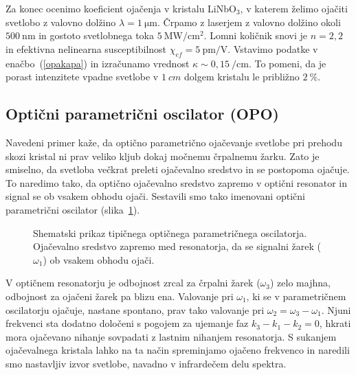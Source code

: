 Za konec ocenimo koeficient ojačenja v kristalu 
LiNbO$_{3}$, v katerem želimo
ojačiti svetlobo z valovno dolžino $\lambda = 1~\si{\micro\metre}$. Črpamo z laserjem z 
valovno dolžino okoli $500~\si{\nano\metre}$ in gostoto svetlobnega 
toka $5~\si{\mega\watt}/\si{\centi\metre}^{2}$. Lomni količnik snovi je 
$n = 2,2$ in efektivna nelinearna susceptibilnost  $\chi_{ef} = 5~\si{\pico\metre}/\si{\volt}$. 
Vstavimo podatke v enačbo~(\ref{opakapa}) in izračunamo vrednost 
$\kappa \sim 0,15~/\si{\centi\metre}$. To pomeni, da je porast intenzitete 
vpadne svetlobe v $1~\si{cm}$ dolgem kristalu le približno $2~\%$. 

\subsection*{Optični parametrični oscilator (OPO)}
Navedeni primer kaže, da optično parametrično ojačevanje svetlobe pri prehodu skozi kristal ni prav veliko
kljub dokaj močnemu črpalnemu žarku. Zato je smiselno, da svetloba večkrat preleti
ojačevalno sredstvo in se postopoma ojačuje. To naredimo tako, 
da optično ojačevalno sredstvo zapremo v optični 
resonator
in signal se ob vsakem obhodu ojači. Sestavili smo tako imenovani
optični parametrični oscilator (slika~\ref{fig:opo}). 
\begin{figure}[ht]
\centering
\def\svgwidth{100truemm} 

\caption{Shematski prikaz tipičnega optičnega parametričnega oscilatorja. Ojačevalno sredstvo
zapremo med resonatorja, da se signalni žarek ($\omega_1$) ob vsakem obhodu ojači.}
\label{fig:opo}
\end{figure}

V optičnem resonatorju je odbojnost zrcal za črpalni žarek ($\omega_3$) zelo majhna, 
odbojnost za ojačeni žarek pa blizu ena. Valovanje pri $\omega_1$,
ki se v parametričnem oscilatorju ojačuje, nastane spontano, prav tako valovanje pri 
$\omega_2 = \omega_3 -\omega_1$. Njuni frekvenci sta dodatno določeni s pogojem za 
ujemanje faz $ k_3 - k_1 - k_2 = 0$, 
hkrati mora ojačevano nihanje sovpadati z lastnim nihanjem resonatorja. 
S sukanjem ojačevalnega kristala lahko na ta način spreminjamo
ojačeno frekvenco in naredili smo nastavljiv izvor svetlobe, navadno v 
infrardečem delu spektra.

